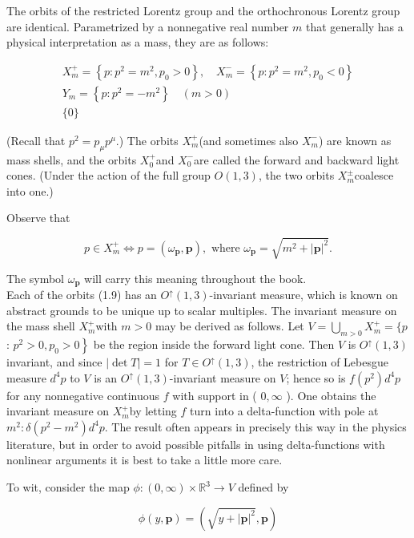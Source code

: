 \documentclass[10pt, letterpaper]{article}
\begin{document}
The orbits of the restricted Lorentz group and the orthochronous Lorentz group are identical. Parametrized by a nonnegative real number $m$ that generally has a physical interpretation as a mass, they are as follows:

$$
\begin{gathered}
X_{m}^{+}=\left\{p: p^{2}=m^{2}, p_{0}>0\right\}, \quad X_{m}^{-}=\left\{p: p^{2}=m^{2}, p_{0}<0\right\} \\
Y_{m}=\left\{p: p^{2}=-m^{2}\right\} \quad(m>0) \\
\{0\}
\end{gathered}
$$

(Recall that $p^{2}=p_{\mu} p^{\mu}$.) The orbits $X_{m}^{+}$(and sometimes also $X_{m}^{-}$) are known as mass shells, and the orbits $X_{0}^{+}$and $X_{0}^{-}$are called the forward and backward light cones. (Under the action of the full group $O(1,3)$, the two orbits $X_{m}^{ \pm}$coalesce into one.)

Observe that

$$
p \in X_{m}^{+} \Longleftrightarrow p=\left(\omega_{\mathbf{p}}, \mathbf{p}\right), \text { where } \omega_{\mathbf{p}}=\sqrt{m^{2}+|\mathbf{p}|^{2}} .
$$

The symbol $\omega_{\mathbf{p}}$ will carry this meaning throughout the book.\\
Each of the orbits (1.9) has an $O^{\uparrow}(1,3)$-invariant measure, which is known on abstract grounds to be unique up to scalar multiples. The invariant measure on the mass shell $X_{m}^{+}$with $m>0$ may be derived as follows. Let $V=\bigcup_{m>0} X_{m}^{+}=\{p$ : $\left.p^{2}>0, p_{0}>0\right\}$ be the region inside the forward light cone. Then $V$ is $O^{\uparrow}(1,3)$ invariant, and since $|\operatorname{det} T|=1$ for $T \in O^{\uparrow}(1,3)$, the restriction of Lebesgue measure $d^{4} p$ to $V$ is an $O^{\uparrow}(1,3)$-invariant measure on $V$; hence so is $f\left(p^{2}\right) d^{4} p$ for any nonnegative continuous $f$ with support in ( $0, \infty$ ). One obtains the invariant measure on $X_{m}^{+}$by letting $f$ turn into a delta-function with pole at $m^{2}: \delta\left(p^{2}-m^{2}\right) d^{4} p$. The result often appears in precisely this way in the physics literature, but in order to avoid possible pitfalls in using delta-functions with nonlinear arguments it is best to take a little more care.

To wit, consider the map $\phi:(0, \infty) \times \mathbb{R}^{3} \rightarrow V$ defined by

$$
\phi(y, \mathbf{p})=\left(\sqrt{y+|\mathbf{p}|^{2}}, \mathbf{p}\right)
$$
\end{document}
